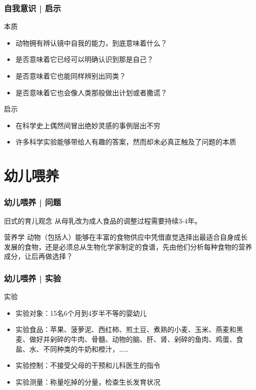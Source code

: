 \begin{frame}
  \frametitle{自我意识 | 启示}
  \begin{block}{本质}
    \begin{itemize}
      \item 动物拥有辨认镜中自我的能力，到底意味着什么？
      \item 是否意味着它已经可以明确认识到那是自己？
      \item 是否意味着它也能同样辨别出同类？
      \item 是否意味着它也会像人类那般做出计划或者撒谎？
    \end{itemize}
  \end{block}
  \pause
  \begin{block}{启示}
    \begin{itemize}
      \item 在科学史上偶然间冒出绝妙灵感的事例层出不穷
      \item 许多科学实验能够带给人有趣的答案，然而却未必真正触及了问题的本质
    \end{itemize}
  \end{block}
\end{frame}

\section{幼儿喂养}
\begin{frame}
  \frametitle{幼儿喂养 | 问题}
  \begin{block}{旧式的育儿观念}
    从母乳改为成人食品的调整过程需要持续3-4年。
  \end{block}
  \pause
  \begin{block}{营养学}
    动物（包括人）能够在丰富的食物供应中凭借直觉选择出最适合自身成长发展的食物，还是必须总从生物化学家制定的食谱，先由他们分析每种食物的营养成分，让后再做选择？
  \end{block}
\end{frame}

\begin{frame}
  \frametitle{幼儿喂养 | 实验}
  \begin{block}{实验}
    \begin{itemize}
      \item 实验对象：15名6个月到4岁半不等的婴幼儿
      \item 实验食品：苹果、菠萝泥、西红柿、煎土豆、煮熟的小麦、玉米、燕麦和黑麦、做好并剁碎的牛肉、骨髓、动物的脑、肝、肾、剁碎的鱼肉、鸡蛋、食盐、水、不同种类的牛奶和橙汁，……
      \item 实验控制：不接受父母的干预和儿科医生的指令
      \item 实验测量：称量吃掉的分量，检查生长发育状况
    \end{itemize}
  \end{block}
\end{frame}

